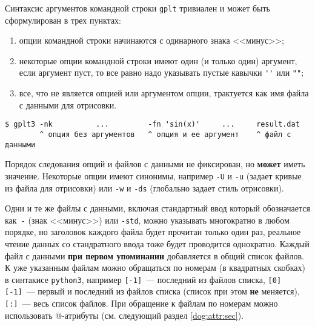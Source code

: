 \documentclass[12pt]{article}
\def\gplt{{\tt gplt}}
\def\python{{\tt python3}}
\begin{document}
Синтаксис аргументов командной строки \gplt{} тривиален и может быть сформулирован в трех пунктах:
\begin{enumerate}
\item опции командной строки начинаются с одинарного знака <<минус>>;
\item некоторые опции командной строки имеют один (и только один) аргумент, если аргумент пуст, то все равно надо указывать пустые кавычки \verb|''| или \verb|""|;
\item все, что не является опцией или аргументом опции, трактуется как имя файла с данными для отрисовки.
\end{enumerate}
\begin{verbatim}
$ gplt3 -nk          ...         -fn 'sin(x)'     ...     result.dat
        ^ опция без аргументов   ^ опция и ее аргумент    ^ файл с данными
\end{verbatim}
Порядок следования опций и файлов с данными не фиксирован, но {\bf может} иметь значение.  Некоторые опции имеют синонимы, например \verb'-U' и \verb'-u'
(задает кривые из файла для отрисовки) или \verb'-w' и \verb'-ds' (глобально задает стиль отрисовки).

Одни и те же файлы с данными, включая стандартный ввод который обозначается как~\verb'-' (знак <<минус>>) или \verb'-std', можно указывать многократно в любом порядке,
но заголовок каждого файла будет прочитан только один раз, реальное чтение данных со стандратного ввода тоже будет проводится однократно.
Каждый файл с данными {\bf при первом упоминании} добавляется в общий список файлов. 
К уже указанным файлам можно обращаться по номерам (в квадратных скобках) в синтакисе \python, например \verb'[-1]'~--- последний из файлов списка,
\verb'[0] [-1]'~--- первый и последний из файлов списка (список при этом {\bf не} меняется), \verb'[:]'~--- весь список файлов.
При обращение к файлам по номерам можно использовать @-атрибуты (см. следующий раздел \ref{dog:attr:sec}). 
\newpage
\end{document}
